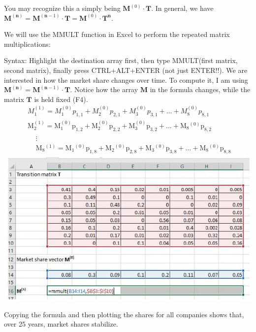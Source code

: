 \documentclass[10pt]{article}
\begin{document}
You may recognize this a simply being $\mathbf{M}^{(0)} \cdot \mathbf{T}$. In general, we have $\mathbf{M}^{(\mathbf{n})}=\mathbf{M}^{(\mathbf{n}-1)} \cdot \mathbf{T}=\mathbf{M}^{(0)} \cdot \mathbf{T}^{\mathbf{n}}$.

We will use the MMULT function in Excel to perform the repeated matrix multiplications:

Syntax: Highlight the destination array first, then type MMULT(first matrix, second matrix), finally press CTRL+ALT+ENTER (not just ENTER!!). We are interested in how the market share changes over time. To compute it, I am using $\mathbf{M}^{(\mathbf{n})}=\mathbf{M}^{(\mathbf{n}-1)} \cdot \mathbf{T}$. Notice how the array $\mathbf{M}$ in the formula changes, while the matrix $\mathbf{T}$ is held fixed (F4).
$$
\begin{aligned}
& M_{1}^{(1)}=M_{1}^{(0)} p_{1,1}+M_{2}^{(0)} p_{2,1}+M_{3}^{(0)} p_{3,1}+\ldots+M_{8}^{(0)} p_{8,1} \\
& \mathrm{M}_{2}^{(1)}=\mathrm{M}_{1}^{(0)} \mathrm{p}_{1,2}+\mathrm{M}_{2}^{(0)} \mathrm{p}_{2,2}+\mathrm{M}_{3}^{(0)} \mathrm{p}_{3,2}+\ldots+\mathrm{M}_{8}{ }^{(0)} \mathrm{p}_{8,2} \\
& \begin{aligned}&\vdots \\&\mathrm{M}_{8}{ }^{(1)}=\mathrm{M}_{1}{ }^{(0)} \mathrm{p}_{1,8}+\mathrm{M}_{2}{ }^{(0)} \mathrm{p}_{2,8}+\mathrm{M}_{3}{ }^{(0)} \mathrm{p}_{3,8}+\ldots+\mathrm{M}_{8}{ }^{(0)} \mathrm{p}_{8,8}\end{aligned} 
\end{aligned}
$$
\includegraphics[max width=\textwidth]{2022_07_05_5945264bba2a5f6ba667g-75}

Copying the formula and then plotting the shares for all companies shows that, over 25 years, market shares stabilize.
\end{document}
